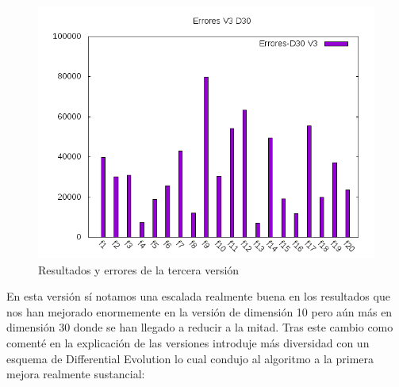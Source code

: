 \documentclass[12pt,a4paper]{article}
\begin{document}
\begin{figure}[!h]
		\includegraphics[scale=0.5]{../Algoritmo/resultados/Imagenes/Errores/errores_v3_d30.png}
		\caption{Resultados y errores de la tercera versión}
	\end{figure}

	\newpage

	En esta versión sí notamos una escalada realmente buena en los resultados que nos han mejorado enormemente en la versión de dimensión 10 pero aún más en dimensión 30 donde se han llegado a reducir a la mitad. Tras este cambio como comenté en la explicación de las versiones introduje más diversidad con un esquema de Differential Evolution lo cual condujo al algoritmo a la primera mejora realmente sustancial:
	
\end{document}
